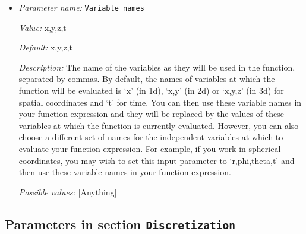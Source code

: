 \begin{itemize}
{\it Possible values:} [Anything]
\item {\it Parameter name:} {\tt Variable names}


{\it Value:} x,y,z,t


{\it Default:} x,y,z,t


{\it Description:} The name of the variables as they will be used in the function, separated by commas. By default, the names of variables at which the function will be evaluated is `x' (in 1d), `x,y' (in 2d) or `x,y,z' (in 3d) for spatial coordinates and `t' for time. You can then use these variable names in your function expression and they will be replaced by the values of these variables at which the function is currently evaluated. However, you can also choose a different set of names for the independent variables at which to evaluate your function expression. For example, if you work in spherical coordinates, you may wish to set this input parameter to `r,phi,theta,t' and then use these variable names in your function expression.


{\it Possible values:} [Anything]
\end{itemize}

\subsection{Parameters in section \tt Discretization}
\label{parameters:Discretization}

